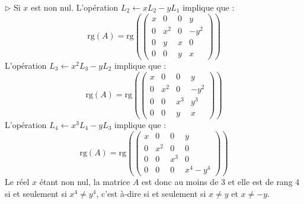 \documentclass[a4paper,10pt]{report}
\begin{document}
\noindent $\rhd$ Si $x$ est non nul. L'opération $L_2 \leftarrow x L_2 - y L_1$ implique que :
$$ \textrm{rg}(A) = \textrm{rg} \left(\begin{pmatrix}
x & 0 & 0& y \\
0 & x^2 & 0 & -y^2 \\
0 & y & x & 0 \\
0 & 0 & y & x
\end{pmatrix} \right)$$
L'opération $L_3 \leftarrow x^2 L_3-y L_2$ implique que :
$$ \textrm{rg}(A) = \textrm{rg} \left(\begin{pmatrix}
x & 0 & 0& y \\
0 & x^2 & 0 & -y^2 \\
0 & 0 & x^3 & y^3 \\
0 & 0 & y & x
\end{pmatrix} \right)$$
L'opération $L_4 \leftarrow x^3 L_4-y L_3$ implique que :
$$ \textrm{rg}(A) = \textrm{rg} \left(\begin{pmatrix}
x & 0 & 0& y \\
0 & x^2 & 0 & 0 \\
0 & 0 & x^3 & 0 \\
0 & 0 & 0 & x^4-y^4
\end{pmatrix} \right)$$
Le réel $x$ étant non nul, la matrice $A$ est donc au moins de $3$ et elle est de rang $4$ si et seulement si $x^4 \neq y^4$, c'est à-dire si et seulement si $x \neq y$ et $x \neq -y$.
%
%
%
%
\end{document}
